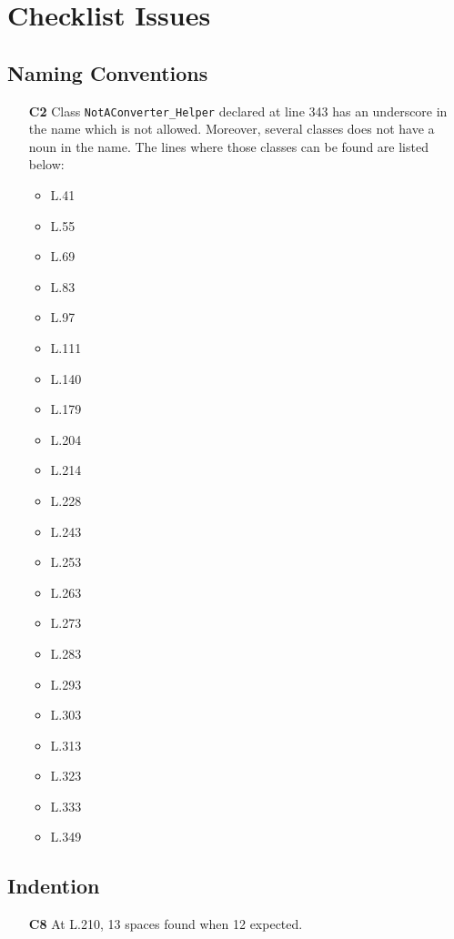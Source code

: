 \section{Checklist Issues}

\subsection{Naming Conventions}
	\begin{itemize}
		\item[\textbf{C2}] Class \texttt{NotAConverter\_Helper} declared at line 343 has an underscore in the name which is not allowed. Moreover, several classes does not have a noun in the name. The lines where those classes can be found are listed below:
		\begin{itemize}
			\item L.41
			\item L.55
			\item L.69
			\item L.83
			\item L.97
			\item L.111
			\item L.140
			\item L.179
			\item L.204
			\item L.214
			\item L.228
			\item L.243
			\item L.253
			\item L.263
			\item L.273
			\item L.283
			\item L.293
			\item L.303
			\item L.313
			\item L.323
			\item L.333
			\item L.349
		\end{itemize}
	\end{itemize}

\subsection{Indention}
	\begin{itemize}
		\item[\textbf{C8}] At L.210, 13 spaces found when 12 expected.
	\end{itemize}



